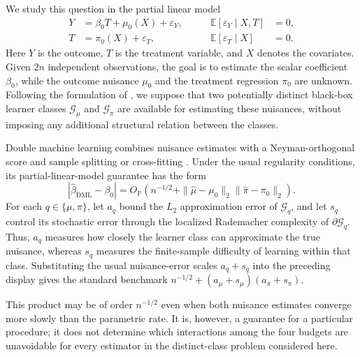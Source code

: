 \documentclass[11pt]{article}
\begin{document}
We study this question in the partial linear model
\begin{equation}
\label{eq:intro-plm}
\begin{aligned}
Y &= \beta_0 T+\mu_0(X)+\varepsilon_Y,
&\qquad \mathbb E[\varepsilon_Y\mid X,T]&=0,\\
T &= \pi_0(X)+\varepsilon_T,
&\qquad \mathbb E[\varepsilon_T\mid X]&=0.
\end{aligned}
\end{equation}
Here \(Y\) is the outcome, \(T\) is the treatment variable, and \(X\) denotes
the covariates. Given \(2n\) independent observations, the goal is to estimate
the scalar coefficient \(\beta_0\), while the outcome nuisance \(\mu_0\) and
the treatment regression \(\pi_0\) are unknown. Following the formulation of
\citet{gu2025open}, we suppose that two potentially distinct black-box learner
classes \(\mathcal G_\mu\) and \(\mathcal G_\pi\) are available for estimating
these nuisances, without imposing any additional structural relation between
the classes.

Double machine learning combines nuisance estimates with a Neyman-orthogonal
score and sample splitting or cross-fitting \citep{chernozhukov2018double}.
Under the usual regularity conditions, its partial-linear-model guarantee has
the form
\[
\left|\widehat\beta_{\mathrm{DML}}-\beta_0\right|
=O_{\mathbb P}\!\left(
n^{-1/2}
+\|\widehat\mu-\mu_0\|_2
 \|\widehat\pi-\pi_0\|_2
\right).
\]
For each \(q\in\{\mu,\pi\}\), let \(a_q\) bound the \(L_2\) approximation
error of \(\mathcal G_q\), and let \(s_q\) control its stochastic error through
the localized Rademacher complexity of \(\partial\mathcal G_q\). Thus,
\(a_q\) measures how closely the learner class can approximate the true
nuisance, whereas \(s_q\) measures the finite-sample difficulty of learning
within that class. Substituting the usual nuisance-error scales \(a_q+s_q\)
into the preceding display gives the standard benchmark $n^{-1/2}+(a_\mu+s_\mu)(a_\pi+s_\pi)$.

This product may be of order \(n^{-1/2}\) even when both nuisance estimates
converge more slowly than the parametric rate. It is, however, a guarantee for
a particular procedure; it does not determine which interactions among the
four budgets are unavoidable for every estimator in the distinct-class
problem considered here.
\end{document}
